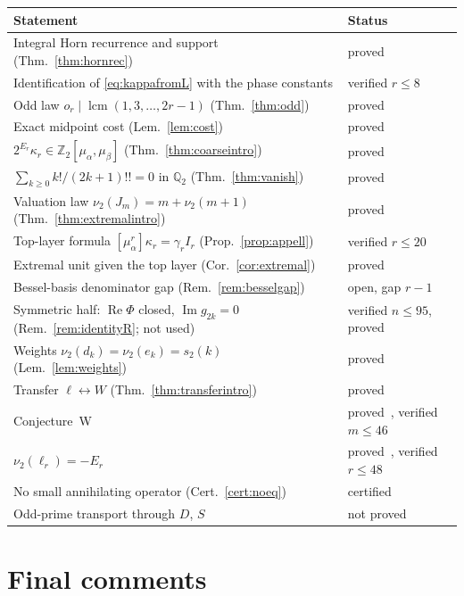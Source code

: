 \documentclass[12pt]{amsart}
\theoremstyle{definition}
\theoremstyle{remark}
\newcommand{\Zt}{\mathbb Z_2}
\newcommand{\Qt}{\mathbb Q_2}
\newcommand{\ma}{\mu_\alpha}
\newcommand{\mb}{\mu_\beta}
\begin{document}
\begin{center}
\small
\begin{tabular}{@{}ll@{}}
\toprule
Statement & Status\\
\midrule
Integral Horn recurrence and support (Thm.~\ref{thm:hornrec})
  & proved\\
Identification of \eqref{eq:kappafromL} with the phase constants
  & verified $r\le8$\\
Odd law $o_r\mid\operatorname{lcm}(1,3,\dots,2r-1)$ (Thm.~\ref{thm:odd})
  & proved\\
Exact midpoint cost (Lem.~\ref{lem:cost})
  & proved\\
$2^{E_r}\kappa_r\in\Zt[\ma,\mb]$ (Thm.~\ref{thm:coarseintro})
  & proved\\
$\sum_{k\ge0}k!/(2k+1)!!=0$ in $\Qt$ (Thm.~\ref{thm:vanish})
  & proved\\
Valuation law $\nu_2(J_m)=m+\nu_2(m+1)$ (Thm.~\ref{thm:extremalintro})
  & proved\\
Top-layer formula $[\ma^r]\kappa_r=\gamma_rI_r$ (Prop.~\ref{prop:appell})
  & verified $r\le20$\\
Extremal unit given the top layer (Cor.~\ref{cor:extremal})
  & proved\\
Bessel-basis denominator gap (Rem.~\ref{rem:besselgap})
  & open, gap $r-1$\\
Symmetric half: $\operatorname{Re}\Phi$ closed, $\operatorname{Im}g_{2k}=0$
  (Rem.~\ref{rem:identityR}; not used)
  & verified $n\le95$, proved~\cite{Ultraspherical}\\
Weights $\nu_2(d_k)=\nu_2(e_k)=s_2(k)$ (Lem.~\ref{lem:weights})
  & proved\\
Transfer $\ell\leftrightarrow W$ (Thm.~\ref{thm:transferintro})
  & proved\\
Conjecture~W
  & proved~\cite{Ultraspherical}, verified $m\le46$\\
$\nu_2(\ell_r)=-E_r$
  & proved~\cite{Ultraspherical}, verified $r\le48$\\
No small annihilating operator (Cert.~\ref{cert:noeq})
  & certified\\
Odd-prime transport through $D$, $S$
  & not proved\\
\bottomrule
\end{tabular}
\end{center}

\section*{Final comments}
\end{document}
